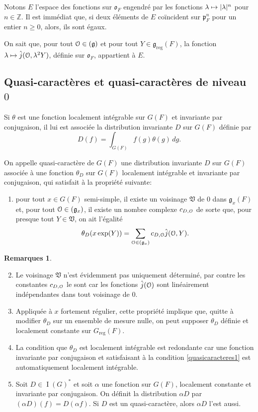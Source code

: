 \documentclass[11pt]{article}
\newcommand{\skpt}{\smallskip}
\numberwithin{equation}{section}\providecommand{\og}{«\,}\providecommand{\fg}{\,»}
\let\mathcal \EuScript
\newcommand{\NoChangel}[1]{%
\expandafter\let\csname old\string#1\endcsname=#1
\let#1=\relax
\newcommand{#1}{\mathcode`l="716C\csname old\string#1\endcsname\mathcode`l="7160 }%
}
\newcommand\mto{\mathchoice{\longmapsto}{\mapsto}{\mapsto}{\mapsto}}
\newcommand{\frg}{\mathfrak{g}}
\newcommand{\fro}{\mathfrak{o}}
\newcommand{\frp}{\mathfrak{p}}
\newcommand{\frV}{\mathfrak{V}}
\newcommand{\Nil}{\mathrm{Nil}} \NoChangel{\Nil}
\newcommand{\reg}{\mathrm{reg}}
\DeclareMathOperator{\rI}{I}
\newcommand{\cO}{\mathcal{O}}
\newcommand{\ZZ}{\mathbb{Z}}
\theoremstyle{plain}
\theoremstyle{definition}
\newtheorem*{rems*}{Remarques}
\begin{document}
Notons $E$ l'espace des fonctions sur $\fro_{F}$ engendré par les fonctions $\lambda\mto \vert \lambda\vert ^n$ pour $n\in \ZZ$. Il est immédiat que, si deux éléments de $E$ coïncident sur $\frp_{F}^n$ pour un entier $n\geq0$, alors, ils sont égaux.

On sait que, pour tout $\cO\in \Nil(\frg)$ et pour tout $Y\in \frg_{\reg}(F)$, la fonction $\lambda\mto \hat{j}(\cO,\lambda^2 Y)$, définie sur $\fro_{F}$, appartient à $E$.

\subsection{Quasi-caractères et quasi-caractères de niveau~\texorpdfstring{$0$}{0}}\label{quasicaracteres}

Si $\theta$ est une fonction localement intégrable sur $G(F)$ et invariante par conjugaison, il lui est associée la distribution invariante $D$ sur $G(F)$ définie par
\[
D(f)=\int_{G(F)}f(g)\theta(g)\,dg.
\]

On appelle quasi-caractère de $G(F)$ une distribution invariante $D$ sur $G(F)$ associée à une fonction $\theta_{D}$ sur $G(F)$ localement intégrable et invariante par conjugaison, qui satisfait à la propriété suivante:
\begin{enumerate}
\item\label{quasicaracteres1}
pour tout $x\in G(F)$ semi-simple, il existe un voisinage $\frV$ de $0$ dans $\frg_{x}(F)$ et, pour tout $\cO\in \Nil(\frg_{x})$, il existe un nombre complexe $c_{D,\cO}$ de sorte que, pour presque tout $Y\in \frV$, on ait l'égalité
\[
\theta_{D}(x \exp(Y))=\sum_{\cO\in \Nil(\frg_{x})}c_{D,\cO}\hat{j}(\cO,Y).
\]
\end{enumerate}

\skpt
\begin{rems*}
\begin{enumerate}\setcounter{enumi}{1}
\item\label{quasicaracteres2}
Le voisinage $\frV$ n'est évidemment pas uniquement déterminé, par contre les constantes $c_{D,\cO}$ le sont car les fonctions $\hat{j}(\cO)$ sont linéairement indépendantes dans tout voisinage de $0$.

\item\label{quasicaracteres3}
Appliquée à $x$ fortement régulier, cette propriété implique que, quitte à modifier $\theta_{D}$ sur un ensemble de mesure nulle, on peut supposer $\theta_{D}$ définie et localement constante sur $G_{\reg}(F)$.

\item\label{quasicaracteres4}
La condition que $\theta_{D}$ est localement intégrable est redondante car une fonction invariante par conjugaison et satisfaisant à la condition \eqref{quasicaracteres1} est automatiquement localement intégrable.

\item\label{quasicaracteres5}
Soit $D\in \rI(G)^*$ et soit $\alpha$ une fonction sur $G(F)$, localement constante et invariante par conjugaison. On définit la distribution $\alpha D$ par $(\alpha D)(f)=D(\alpha f)$. Si $D$ est un quasi-caractère, alors $\alpha D$ l'est aussi.
\end{enumerate}
\end{rems*}
\end{document}
